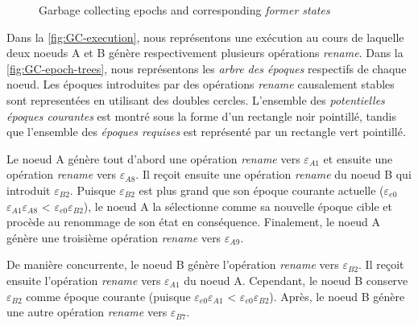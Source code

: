 \documentclass[12pt]{thesul}
\newcommand{\epoch}[1]{$\varepsilon_{#1}$}
\begin{document}
\begin{figure}[!ht]
{\begin{minipage}{\linewidth}
          \label{fig:GC-epoch-trees}
      \end{minipage}}
  \caption{Garbage collecting epochs and corresponding \emph{former states}}
  \label{fig:GC-epochs}
\end{figure}

Dans la \autoref{fig:GC-execution}, nous représentons une exécution au cours de laquelle deux noeuds A et B génère respectivement plusieurs opérations \emph{rename}.
Dans la \autoref{fig:GC-epoch-trees}, nous représentons les \emph{arbre des époques} respectifs de chaque noeud.
Les époques introduites par des opérations \emph{rename} causalement stables sont representées en utilisant des doubles cercles.
L'ensemble des \emph{potentielles époques courantes} est montré sous la forme d'un rectangle noir pointillé, tandis que l'ensemble des \emph{époques requises} est représenté par un rectangle vert pointillé.


Le noeud A génère tout d'abord une opération \emph{rename} vers \epoch{A1} et ensuite une opération \emph{rename} vers \epoch{A8}.
Il reçoit ensuite une opération \emph{rename} du noeud B qui introduit \epoch{B2}.
Puisque \epoch{B2} est plus grand que son époque courante actuelle (\epoch{e0}\epoch{A1}\epoch{A8} < \epoch{e0}\epoch{B2}), le noeud A la sélectionne comme sa nouvelle époque cible et procède au renommage de son état en conséquence.
Finalement, le noeud A génère une troisième opération \emph{rename} vers \epoch{A9}.

De manière concurrente, le noeud B génère l'opération \emph{rename} vers \epoch{B2}.
Il reçoit ensuite l'opération \emph{rename} vers \epoch{A1} du noeud A.
Cependant, le noeud B conserve \epoch{B2} comme époque courante (puisque \epoch{e0}\epoch{A1} < \epoch{e0}\epoch{B2}).
Après, le noeud B génère une autre opération \emph{rename} vers \epoch{B7}.
\end{document}
